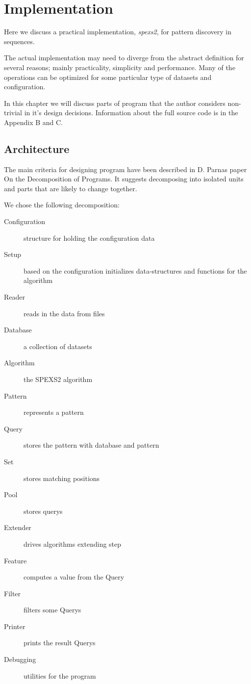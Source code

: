 \chapter{Implementation}

Here we discuss a practical implementation, \emph{spexs2}, for
pattern discovery in sequences.

The actual implementation may need to diverge from the abstract
definition for several reasons; mainly practicality, simplicity and
performance. Many of the operations can be optimized for some 
particular type of datasets and configuration.

In this chapter we will discuss parts of program that the author
considers non-trivial in it's design decisions. Information about 
the full source code is in the Appendix B and C.

\section{Architecture}

The main criteria for designing program have been described in D. Parnas
paper On the Decomposition of Programs. It suggests decomposing into
isolated units and parts that are likely to change together. \cite{Parnas72}

We chose the following decomposition:

\begin{description}
	\item[Configuration] structure for holding the configuration data
	\item[Setup] based on the configuration initializes data-structures and functions for the algorithm
	\item[Reader] reads in the data from files
	\item[Database] a collection of datasets
	\item[Algorithm] the SPEXS2 algorithm
		\item[Pattern] represents a pattern
		\item[Query] stores the pattern with database and pattern
		\item[Set] stores matching positions
		\item[Pool] stores querys
		\item[Extender] drives algorithms extending step
		\item[Feature] computes a value from the Query
		\item[Filter] filters some Querys
	\item[Printer] prints the result Querys
	\item[Debugging] utilities for the program
\end{description}

